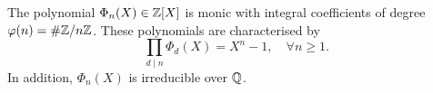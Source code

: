 \begin{theorem}\label{characterise cyclotomic polynomials}
    The polynomial $\Phi_n(X)\in\mathbb{Z}[X]$ is monic
    with integral coefficients of degree $\varphi(n) = \# \mathbb{Z}/n\mathbb{Z}$. These polynomials are characterised by\[\prod_{d\mid n}\Phi_d(X) = X^n - 1,\quad \forall n\ge 1.\]
    In addition, $\Phi_n(X)$ is irreducible over $\mathbb{Q}$.
\end{theorem}



















